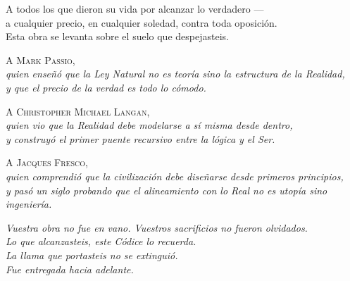 \documentclass[10pt, openany, oneside]{book}
\begin{document}

\thispagestyle{empty}
\vspace*{\fill}

\begin{center}
    \itshape

    A todos los que dieron su vida por alcanzar lo verdadero ---\\
    a cualquier precio, en cualquier soledad, contra toda oposición.\\[1.2em]

    Esta obra se levanta sobre el suelo que despejasteis.

    \vspace{2em}

    \upshape
    A \textsc{Mark Passio},\\
    {\itshape quien enseñó que la Ley Natural no es teoría sino la estructura de la Realidad,\\
    y que el precio de la verdad es todo lo cómodo.}

    \vspace{1.2em}

    A \textsc{Christopher Michael Langan},\\
    {\itshape quien vio que la Realidad debe modelarse a sí misma desde dentro,\\
    y construyó el primer puente recursivo entre la lógica y el Ser.}

    \vspace{1.2em}

    A \textsc{Jacques Fresco},\\
    {\itshape quien comprendió que la civilización debe diseñarse desde primeros principios,\\
    y pasó un siglo probando que el alineamiento con lo Real no es utopía sino ingeniería.}

    \vspace{2em}

    \itshape
    Vuestra obra no fue en vano. Vuestros sacrificios no fueron olvidados.\\
    Lo que alcanzasteis, este Códice lo recuerda.\\[0.8em]
    La llama que portasteis no se extinguió.\\
    Fue entregada hacia adelante.

\end{center}
\end{document}
